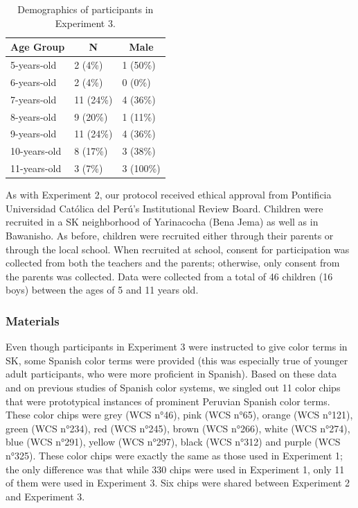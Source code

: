 \documentclass[,man,floatsintext]{apa6}
\theoremstyle{definition}
\theoremstyle{definition}
\theoremstyle{definition}
\theoremstyle{remark}
\begin{document}
\begin{table}[tbp]
\begin{center}
\begin{threeparttable}
\caption{\label{tab:unnamed-chunk-5}Demographics of participants in Experiment 3.}
\begin{tabular}{lll}
\toprule
Age Group & \multicolumn{1}{c}{N} & \multicolumn{1}{c}{Male}\\
\midrule
5-years-old & 2 (4\%) & 1 (50\%)\\
6-years-old & 2 (4\%) & 0 (0\%)\\
7-years-old & 11 (24\%) & 4 (36\%)\\
8-years-old & 9 (20\%) & 1 (11\%)\\
9-years-old & 11 (24\%) & 4 (36\%)\\
10-years-old & 8 (17\%) & 3 (38\%)\\
11-years-old & 3 (7\%) & 3 (100\%)\\
\bottomrule
\end{tabular}
\end{threeparttable}
\end{center}
\end{table}

As with Experiment 2, our protocol received ethical approval from
Pontificia Universidad Católica del Perú's Institutional Review Board.
Children were recruited in a SK neighborhood of Yarinacocha (Bena Jema)
as well as in Bawanisho. As before, children were recruited either
through their parents or through the local school. When recruited at
school, consent for participation was collected from both the teachers
and the parents; otherwise, only consent from the parents was collected.
Data were collected from a total of 46 children (16 boys) between the
ages of 5 and 11 years old.

\subsubsection{Materials}\label{materials-2}

Even though participants in Experiment 3 were instructed to give color
terms in SK, some Spanish color terms were provided (this was especially
true of younger adult participants, who were more proficient in
Spanish). Based on these data and on previous studies of Spanish color
systems, we singled out 11 color chips that were prototypical instances
of prominent Peruvian Spanish color terms. These color chips were grey
(WCS n°46), pink (WCS n°65), orange (WCS n°121), green (WCS n°234), red
(WCS n°245), brown (WCS n°266), white (WCS n°274), blue (WCS n°291),
yellow (WCS n°297), black (WCS n°312) and purple (WCS n°325). These
color chips were exactly the same as those used in Experiment 1; the
only difference was that while 330 chips were used in Experiment 1, only
11 of them were used in Experiment 3. Six chips were shared between
Experiment 2 and Experiment 3.
\end{document}
